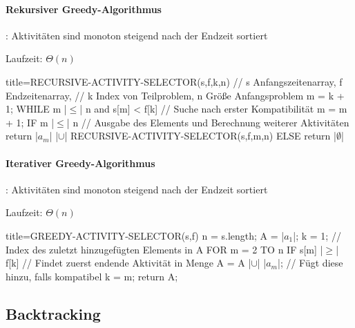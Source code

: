 \documentclass[
    ngerman,
    color=3b,
    dark_mode,
    load_common, %
    summary,
    boxarc,
]{tuda_summary}
\begin{document}
\paragraph{Rekursiver Greedy-Algorithmus}\mbox{}
\begin{grayInfoBox}
    : Aktivitäten sind monoton steigend nach der Endzeit sortiert
\end{grayInfoBox}
Laufzeit: $\Theta(n)$

\begin{codeBlock}[autogobble,escapeinside=||]{title={RECURSIVE-ACTIVITY-SELECTOR(s,f,k,n)}}
    // s Anfangszeitenarray, f Endzeitenarray, 
    // k Index von Teilproblem, n Grö\ss{}e Anfangsproblem
    m = k + 1;
    WHILE m |$\leq$| n and s[m] < f[k]  // Suche nach erster Kompatibilität
        m = m + 1;
    IF m |$\leq$| n
        // Ausgabe des Elements und Berechnung weiterer Aktivitäten
        return {|$a_m$|} |$\cup$| RECURSIVE-ACTIVITY-SELECTOR(s,f,m,n)
    ELSE
        return |$\emptyset$|
\end{codeBlock}

\paragraph{Iterativer Greedy-Algorithmus}\mbox{}
\begin{grayInfoBox}
    : Aktivitäten sind monoton steigend nach der Endzeit sortiert
\end{grayInfoBox}
Laufzeit: $\Theta(n)$
\begin{codeBlock}[autogobble,escapeinside=||]{title={GREEDY-ACTIVITY-SELECTOR(s,f)}}
    n = s.length;
    A = {|$a_1$|};
    k = 1;          // Index des zuletzt hinzugefügten Elements in A
    FOR m = 2 TO n                      
        IF s[m] |$\geq$| f[k]       // Findet zuerst endende Aktivität in Menge
            A = A |$\cup$| {|$a_m$|};   // Fügt diese hinzu, falls kompatibel
            k = m;
    return A;
\end{codeBlock}

\clearpage
\subsection{Backtracking}
\end{document}
